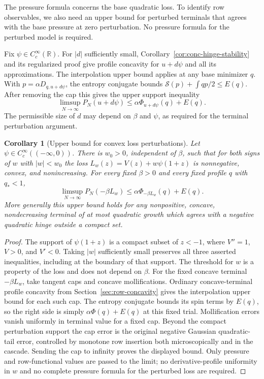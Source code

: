 \documentclass[11pt,a4paper]{article}
\numberwithin{equation}{section}
\newtheorem{corollary}[theorem]{Corollary}
\theoremstyle{definition}
\theoremstyle{remark}
\newcommand{\R}{\mathbb R}
\begin{document}
The pressure formula concerns the base quadratic loss. To identify row
observables, we also need an upper bound for perturbed terminals that
agrees with the base pressure at zero perturbation. No pressure formula
for the perturbed model is required.

Fix $\psi\in C_c^\infty(\R)$. For $|d|$ sufficiently small,
Corollary~\ref{cor:conc-hinge-stability} and its regularized proof give
profile concavity for $u+d\psi$ and all its approximations. The interpolation upper bound applies at any base
minimizer $q$. With $p=\alpha D_{q,u+d\psi}$, the entropy conjugate bounds
$\mathcal S(p)+\int qp/2\le E(q)$. After removing the cap this gives the
upper support inequality
\begin{equation}\label{eq:src11}
 \limsup_{N\to\infty}P_N(u+d\psi)
 \le\alpha\Phi_{u+d\psi}(q)+E(q).
\end{equation}
The permissible size of $d$ may depend on $\beta$ and $\psi$, as required
for the terminal perturbation argument.


\begin{corollary}[Upper bound for convex loss perturbations]
\label{cor:press-convex-loss-upper}
Let $\psi\in C_c^\infty(( -\infty,0))$. There is $w_0>0$, independent
of $\beta$, such that for both signs of $w$ with $|w|<w_0$ the loss
$L_w(z)=V(z)+w\psi(1+z)$ is nonnegative, convex, and nonincreasing. For every
fixed $\beta>0$ and every fixed profile $q$ with $q_*<1$,
\begin{equation}\label{eq:press-convex-loss-upper}
 \limsup_{N\to\infty}P_N(-\beta L_w)
 \le\alpha\Phi_{-\beta L_w}(q)+E(q).
\end{equation}
More generally this upper bound holds for any nonpositive, concave,
nondecreasing terminal of at most quadratic growth which agrees with a
negative quadratic hinge outside a compact set.
\end{corollary}

\begin{proof}
The support of $\psi(1+z)$ is a compact subset of $z<-1$, where $V''=1$,
$V>0$, and $V'<0$. Taking $|w|$ sufficiently small preserves all three
asserted inequalities, including at the boundary of that support.
The threshold for $w$ is a property of the loss and does not depend on
$\beta$. For the fixed concave terminal $-\beta L_w$, take tangent caps
and concave mollifications. Ordinary concave-terminal profile concavity
from Section~\ref{sec:row-concavity} gives the interpolation upper bound
for each such cap. The entropy conjugate bounds its spin terms by $E(q)$,
so the right side is simply $\alpha\Phi(q)+E(q)$ at this fixed trial.
Mollification errors vanish uniformly in terminal value for a fixed cap.
Beyond the compact perturbation support the cap error is the original
negative Gaussian quadratic-tail error, controlled by monotone row
insertion both microscopically and in the cascade. Sending the cap to
infinity proves the displayed bound. Only pressure and row-functional
values are passed to the limit; no derivative-profile uniformity in $w$
and no complete pressure formula for the perturbed loss are required.
\end{proof}
\end{document}
